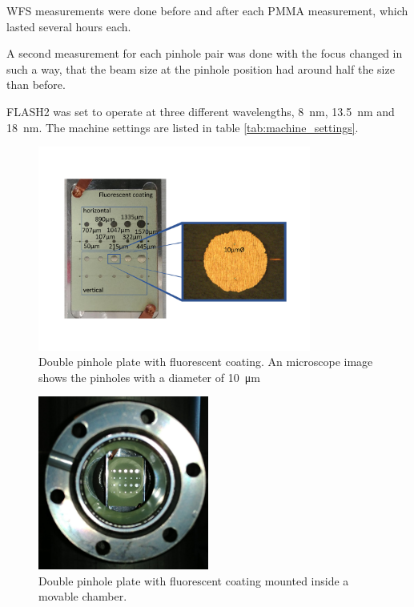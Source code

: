 \documentclass{osa-article}
\begin{document}
WFS measurements were done before and after each PMMA measurement, which lasted several hours each.

A second measurement for each pinhole pair was done with the focus changed in such a way, that the beam size at the pinhole position had around half the size than before.

FLASH2 was set to operate at three different wavelengths, \SI{8}{nm}, \SI{13.5}{nm} and \SI{18}{nm}. The machine settings are listed in table \ref{tab:machine_settings}.

\begin{figure}[htbp]
    \centering
    \includegraphics[width=0.8\textwidth]{gfx/pinholeplate_with_microscope_example.pdf}
    \caption{Double pinhole plate with fluorescent coating. An microscope image shows the pinholes with a diameter of \SI{10}{\micro\meter}}
    \label{fig:pinholeplate_with_microscope_example}
\end{figure}

\begin{figure}[htbp]
    \centering
    \includegraphics[width=0.5\textwidth]{gfx/pinholeplate_in_chamber.jpg}
    \caption{Double pinhole plate with fluorescent coating mounted inside a movable chamber.}
    \label{fig:pinholeplate_in_chamber}
\end{figure}
\end{document}
